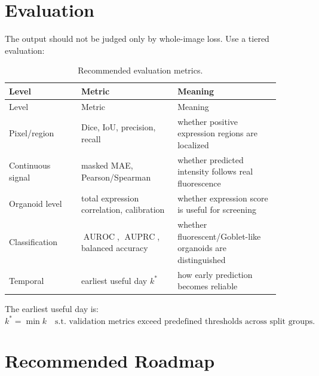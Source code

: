 \documentclass[11pt]{article}
\newcommand{\AUROC}{\operatorname{AUROC}}
\newcommand{\AUPRC}{\operatorname{AUPRC}}
\begin{document}
\section{Evaluation}
The output should not be judged only by whole-image loss. Use a tiered evaluation:

\begin{longtable}{@{}p{0.24\linewidth}p{0.32\linewidth}p{0.34\linewidth}@{}}
\caption{Recommended evaluation metrics.}\label{tab:metrics}\\
\toprule
Level & Metric & Meaning\\
\midrule
\endfirsthead
\toprule
Level & Metric & Meaning\\
\midrule
\endhead
Pixel/region & Dice, IoU, precision, recall & whether positive expression regions are localized\\
Continuous signal & masked MAE, Pearson/Spearman & whether predicted intensity follows real fluorescence\\
Organoid level & total expression correlation, calibration & whether expression score is useful for screening\\
Classification & \(\AUROC\), \(\AUPRC\), balanced accuracy & whether fluorescent/Goblet-like organoids are distinguished\\
Temporal & earliest useful day \(k^*\) & how early prediction becomes reliable\\
\bottomrule
\end{longtable}

The earliest useful day is:
\[
k^*=\min k \quad \text{s.t. validation metrics exceed predefined thresholds across split groups.}
\]

\section{Recommended Roadmap}
\begin{center}
\end{center}
\end{document}
